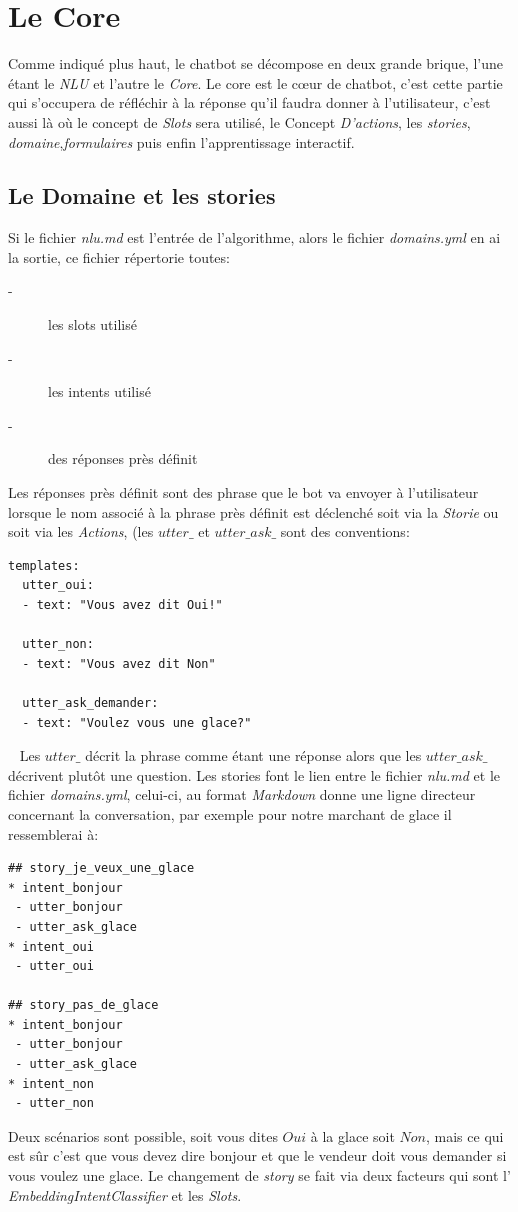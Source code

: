 \chapter{Le Core}

Comme indiqué plus haut, le chatbot se décompose en deux grande brique, l'une étant le \textit{NLU} et l'autre le \textit{Core}. Le core est le cœur de chatbot, c'est cette partie qui s'occupera de réfléchir à la réponse qu'il faudra donner à l'utilisateur, c'est aussi là où le concept de \textit{Slots} sera utilisé, le Concept \textit{D'actions}, les \textit{stories}, \textit{domaine},\textit{formulaires} puis enfin l'apprentissage interactif.\\
\pagebreak

\section{Le Domaine et les stories}
Si le fichier \textit{nlu.md} est l'entrée de l'algorithme, alors le fichier \textit{domains.yml} en ai la sortie, ce fichier répertorie toutes:

\begin{description}
\item[-] les slots utilisé
\item[-] les intents utilisé
\item[-] des réponses près définit 
\end{description}

Les réponses près définit sont des phrase que le bot va envoyer à l'utilisateur lorsque le nom associé à la phrase près définit est déclenché soit via la \textit{Storie} ou soit via les \textit{Actions}, (les \textit{$utter\_$} et \textit{$utter\_ask\_$} sont des conventions:

\begin{lstlisting}
templates:
  utter_oui:
  - text: "Vous avez dit Oui!"

  utter_non:
  - text: "Vous avez dit Non"
  
  utter_ask_demander:
  - text: "Voulez vous une glace?"
\end{lstlisting}
\ \linebreak
Les \textit{$utter\_$} décrit la phrase comme étant une réponse alors que les \textit{$utter\_ask\_$} décrivent plutôt une question.
Les stories font le lien entre le fichier \textit{nlu.md} et le fichier \textit{domains.yml}, celui-ci, au format \textit{Markdown} donne une ligne directeur concernant la conversation, par exemple pour notre marchant de glace il ressemblerai à:

\begin{lstlisting}
## story_je_veux_une_glace
* intent_bonjour
 - utter_bonjour
 - utter_ask_glace
* intent_oui
 - utter_oui
 
## story_pas_de_glace
* intent_bonjour
 - utter_bonjour
 - utter_ask_glace
* intent_non
 - utter_non
\end{lstlisting}

Deux scénarios sont possible, soit vous dites $Oui$ à la glace soit $Non$, mais ce qui est sûr c'est que vous devez dire bonjour et que le vendeur doit vous demander si vous voulez une glace.
Le changement de \textit{story} se fait via deux facteurs qui sont l' \textit{EmbeddingIntentClassifier} et les \textit{Slots}.